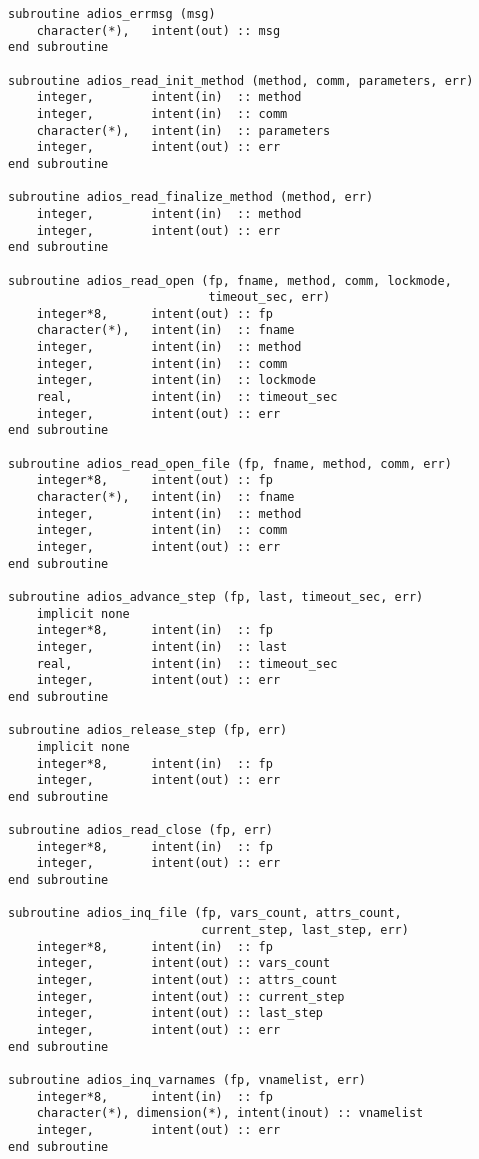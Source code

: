 \begin{lstlisting}[language=ADIOS,alsolanguage=Fortran]
subroutine adios_errmsg (msg)
    character(*),   intent(out) :: msg
end subroutine

subroutine adios_read_init_method (method, comm, parameters, err)
    integer,        intent(in)  :: method
    integer,        intent(in)  :: comm
    character(*),   intent(in)  :: parameters
    integer,        intent(out) :: err
end subroutine

subroutine adios_read_finalize_method (method, err)
    integer,        intent(in)  :: method
    integer,        intent(out) :: err
end subroutine

subroutine adios_read_open (fp, fname, method, comm, lockmode, 
                            timeout_sec, err)
    integer*8,      intent(out) :: fp
    character(*),   intent(in)  :: fname
    integer,        intent(in)  :: method
    integer,        intent(in)  :: comm
    integer,        intent(in)  :: lockmode
    real,           intent(in)  :: timeout_sec
    integer,        intent(out) :: err
end subroutine

subroutine adios_read_open_file (fp, fname, method, comm, err)
    integer*8,      intent(out) :: fp
    character(*),   intent(in)  :: fname
    integer,        intent(in)  :: method
    integer,        intent(in)  :: comm
    integer,        intent(out) :: err
end subroutine

subroutine adios_advance_step (fp, last, timeout_sec, err)
    implicit none
    integer*8,      intent(in)  :: fp
    integer,        intent(in)  :: last
    real,           intent(in)  :: timeout_sec
    integer,        intent(out) :: err
end subroutine

subroutine adios_release_step (fp, err)
    implicit none
    integer*8,      intent(in)  :: fp
    integer,        intent(out) :: err
end subroutine

subroutine adios_read_close (fp, err)
    integer*8,      intent(in)  :: fp
    integer,        intent(out) :: err
end subroutine

subroutine adios_inq_file (fp, vars_count, attrs_count, 
                           current_step, last_step, err)
    integer*8,      intent(in)  :: fp
    integer,        intent(out) :: vars_count
    integer,        intent(out) :: attrs_count
    integer,        intent(out) :: current_step
    integer,        intent(out) :: last_step
    integer,        intent(out) :: err
end subroutine

subroutine adios_inq_varnames (fp, vnamelist, err)
    integer*8,      intent(in)  :: fp
    character(*), dimension(*), intent(inout) :: vnamelist
    integer,        intent(out) :: err
end subroutine


\end{lstlisting}
